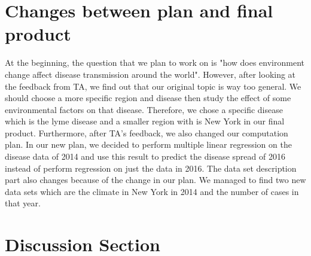 \documentclass[fontsize=11pt]{article}
\begin{document}
\begin{enumerate}
  
  
  
  
\end{enumerate}


\section*{Changes between plan and final product
}
At the beginning, the question that we plan to work on is "how does environment change affect disease transmission around the world". However, after looking at the feedback from TA, we find out that our original topic is way too general. We should choose a more specific region and disease then study the effect of some environmental factors on that disease. Therefore, we chose a specific disease which is the lyme disease and a smaller region with is New York in our final product. Furthermore, after TA's feedback, we also changed our computation plan. In our new plan, we decided to perform multiple linear regression on the disease data of 2014 and use this result to predict the disease spread of 2016 instead of perform regression on just the data in 2016. The data set description part also changes because of the change in our plan. We managed to find two new data sets which are the climate in New York in 2014 and the number of cases in that year. 


\section*{Discussion Section}
\end{document}
